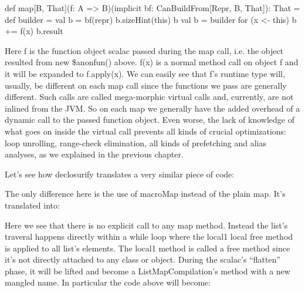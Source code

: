 def map[B, That](f: A => B)(implicit bf: CanBuildFrom[Repr, B, That]): That =
{
    def builder = {
      val b = bf(repr)
      b.sizeHint(this)
      b
    }
    val b = builder
    for (x <- this) b += f(x)
    b.result
}

Here f is the function object scalac passed during the map call, i.e. the
object resulted from new \$anonfun() above. f(x) is a
normal method call on object f and it will be expanded to f.apply(x). We can
easily see that f's runtime type will, usually, be different on each map call
since the functions we pass are generally different. Such calls are called
mega-morphic virtual calls and, currently, are not inlined from the JVM. So on
each map we generally have the added overhead of a dynamic call to the passed
function object. Even worse, the lack of knowledge of what goes on inside the
virtual call prevents all kinds of crucial optimizations: loop unrolling,
range-check elimination, all kinds of prefetching and alias analyses, as we
explained in the previous chapter.

Let's see how declosurify translates a very similar piece of code:


The only difference here is the use of macroMap instead of the plain map. It's
translated into:


Here we see that there is no explicit call to any map method. Instead the
list's traveral happens directly within a while loop where the local1 local free
method is applied to all list's elements. The local1 method is called a free
method since it's not directly attached to any class or object. During the
scalac's ``flatten'' phase, it will be lifted and become a ListMapCompilation's
method with a new mangled name. In particular the code above will become:

